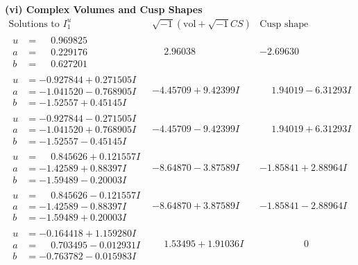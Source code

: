 \documentclass[1p]{elsarticle_modified}
\theoremstyle{definition}
\newcommand{\I}{\sqrt{-1}}
\begin{document}
\newpage\flushleft \textbf{(vi) Complex Volumes and Cusp Shapes}
$$\begin{array}{c|c|c}  
\text{Solutions to }I^u_{1}& \I (\text{vol} + \sqrt{-1}CS) & \text{Cusp shape}\\
 \hline 
\begin{aligned}
u &= \phantom{-}0.969825\phantom{ +0.000000I} \\
a &= \phantom{-}0.229176\phantom{ +0.000000I} \\
b &= \phantom{-}0.627201\phantom{ +0.000000I}\end{aligned}
 & \phantom{-}2.96038\phantom{ +0.000000I} & -2.69630\phantom{ +0.000000I} \\ \hline\begin{aligned}
u &= -0.927844 + 0.271505 I \\
a &= -1.041520 - 0.768905 I \\
b &= -1.52557 + 0.45145 I\end{aligned}
 & -4.45709 + 9.42399 I & \phantom{-}1.94019 - 6.31293 I \\ \hline\begin{aligned}
u &= -0.927844 - 0.271505 I \\
a &= -1.041520 + 0.768905 I \\
b &= -1.52557 - 0.45145 I\end{aligned}
 & -4.45709 - 9.42399 I & \phantom{-}1.94019 + 6.31293 I \\ \hline\begin{aligned}
u &= \phantom{-}0.845626 + 0.121557 I \\
a &= -1.42589 + 0.88397 I \\
b &= -1.59489 - 0.20003 I\end{aligned}
 & -8.64870 - 3.87589 I & -1.85841 + 2.88964 I \\ \hline\begin{aligned}
u &= \phantom{-}0.845626 - 0.121557 I \\
a &= -1.42589 - 0.88397 I \\
b &= -1.59489 + 0.20003 I\end{aligned}
 & -8.64870 + 3.87589 I & -1.85841 - 2.88964 I \\ \hline\begin{aligned}
u &= -0.164418 + 1.159280 I \\
a &= \phantom{-}0.703495 - 0.012931 I \\
b &= -0.763782 - 0.015983 I\end{aligned}
 & \phantom{-}1.53495 + 1.91036 I & \phantom{-0.000000 } 0 \\ \hline\begin{aligned}

\end{aligned}
\end{array}$$
\end{document}
